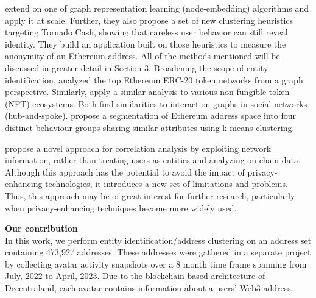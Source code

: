 \documentclass[12pt,a4paper,titlepage,oneside,english]{article}
\begin{document}
\cite{wu2022tutela} extend on one of \cite{Beres2020} graph representation learning (node-embedding) algorithms and apply it at scale. Further, they also propose a set of new clustering heuristics targeting Tornado Cash, showing that careless user behavior can still reveal identity. They build an application built on those heuristics to measure the anonymity of an Ethereum address. \newline
All of the methods mentioned will be discussed in greater detail in Section 3. \newline
Broadening the scope of entity identification, \cite{victorlüders2019} analyzed the top Ethereum ERC-20 token networks from a graph perspective. Similarly, \cite{casalebrunet2021} apply a similar analysis to various non-fungible token (NFT) ecosystems. Both find similarities to interaction graphs in social networks (hub-and-spoke). \cite{Payette2017} propose a segmentation of Ethereum address space into four distinct behaviour groups sharing similar attributes using k-means clustering. 

\cite{yu2023} propose a novel approach for correlation analysis by exploiting network information, rather than treating users as entities and analyzing on-chain data. Although this approach has the potential to avoid the impact of privacy-enhancing technologies, it introduces a new set of limitations and problems. Thus, this approach may be of great interest for further research, particularly when privacy-enhancing techniques become more widely used.



\textbf{Our contribution}\\
In this work, we perform entity identification/address clustering on an address set containing 473,927 addresses. 
These addresses were gathered in a separate project by collecting avatar activity snapshots over a 8 month time frame spanning from July, 2022 to April, 2023. Due to the blockchain-based architecture of Decentraland, each avatar contains information about a users' Web3 address. 
\end{document}
